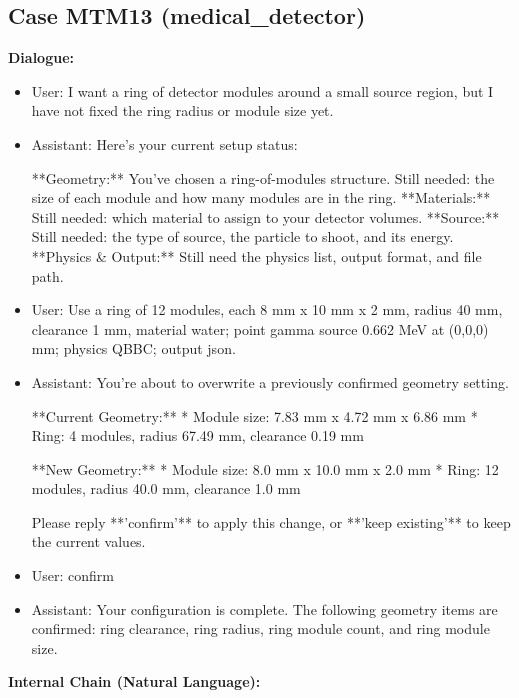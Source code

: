 \documentclass[11pt]{ctexart}
\begin{document}
\subsection{Case MTM13 (medical\_detector)}
\textbf{Dialogue:}
\begin{itemize}
\item User: I want a ring of detector modules around a small source region, but I have not fixed the ring radius or module size yet.
\item Assistant: Here's your current setup status:

**Geometry:** You've chosen a ring-of-modules structure. Still needed: the size of each module and how many modules are in the ring.
**Materials:** Still needed: which material to assign to your detector volumes.
**Source:** Still needed: the type of source, the particle to shoot, and its energy.
**Physics \& Output:** Still need the physics list, output format, and file path.
\item User: Use a ring of 12 modules, each 8 mm x 10 mm x 2 mm, radius 40 mm, clearance 1 mm, material water; point gamma source 0.662 MeV at (0,0,0) mm; physics QBBC; output json.
\item Assistant: You're about to overwrite a previously confirmed geometry setting.

**Current Geometry:**
*   Module size: 7.83 mm x 4.72 mm x 6.86 mm
*   Ring: 4 modules, radius 67.49 mm, clearance 0.19 mm

**New Geometry:**
*   Module size: 8.0 mm x 10.0 mm x 2.0 mm
*   Ring: 12 modules, radius 40.0 mm, clearance 1.0 mm

Please reply **'confirm'** to apply this change, or **'keep existing'** to keep the current values.
\item User: confirm
\item Assistant: Your configuration is complete. The following geometry items are confirmed: ring clearance, ring radius, ring module count, and ring module size.
\end{itemize}
\textbf{Internal Chain (Natural Language):}
\end{document}
